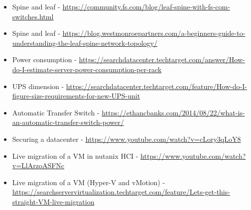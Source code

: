 \begin{itemize}
\item
  Spine and leaf -
  \url{https://community.fs.com/blog/leaf-spine-with-fs-com-switches.html}
\item
  Spine and leaf -
  \url{https://blog.westmonroepartners.com/a-beginners-guide-to-understanding-the-leaf-spine-network-topology/}
\item
  Power consumption -
  \url{https://searchdatacenter.techtarget.com/answer/How-do-I-estimate-server-power-consumption-per-rack}
\item
  UPS dimension -
  \url{https://searchdatacenter.techtarget.com/feature/How-do-I-figure-size-requirements-for-new-UPS-unit}
\item
  Automatic Transfer Switch -
  \url{https://ethancbanks.com/2014/08/22/what-is-an-automatic-transfer-switch-power/}
\item
  Securing a datacenter -
  \url{https://www.youtube.com/watch?v=cLory3qLoY8}
\item
  Live migration of a VM in nutanix HCI -
  \url{https://www.youtube.com/watch?v=LlArzoASFNc}
\item
  Live migration of a VM (Hyper-V and vMotion) -
  \url{https://searchservervirtualization.techtarget.com/feature/Lets-get-this-straight-VM-live-migration}
\end{itemize}